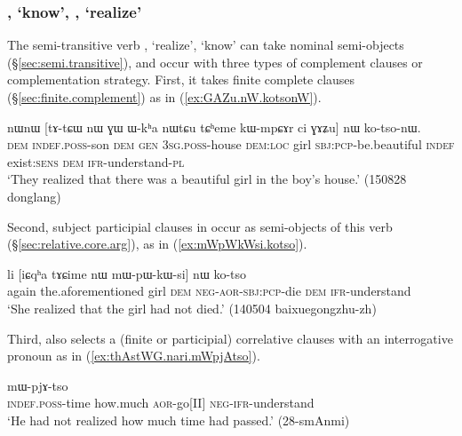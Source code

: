 \subsubsection{, `know', , `realize'} \label{sec:tso.sWXsAl}
The semi-transitive verb , `realize',  `know' can take nominal semi-objects (§\ref{sec:semi.transitive}), and occur with three types of complement clauses or complementation strategy. First, it takes finite complete clauses (§\ref{sec:finite.complement}) as in (\ref{ex:GAZu.nW.kotsonW}).

\begin{exe}
\ex \label{ex:GAZu.nW.kotsonW}
\gll  nɯnɯ [tɤ-tɕɯ nɯ ɣɯ ɯ-kʰa nɯtɕu tɕʰeme kɯ-mpɕɤr ci ɣɤʑu] nɯ ko-tso-nɯ. \\
\textsc{dem} \textsc{indef}.\textsc{poss}-son \textsc{dem} \textsc{gen} \textsc{3sg}.\textsc{poss}-house \textsc{dem}:\textsc{loc} girl \textsc{sbj}:\textsc{pcp}-be.beautiful \textsc{indef} exist:\textsc{sens} \textsc{dem} \textsc{ifr}-understand-\textsc{pl} \\
\glt `They realized that there was a beautiful girl in the boy's house.' (150828 donglang)
\end{exe}

Second, subject participial clauses in  occur as semi-objects of this verb (§\ref{sec:relative.core.arg}), as in (\ref{ex:mWpWkWsi.kotso}).

\begin{exe}
\ex \label{ex:mWpWkWsi.kotso}
\gll  li [iɕqʰa tɤɕime nɯ mɯ-pɯ-kɯ-si] nɯ ko-tso \\
again the.aforementioned girl \textsc{dem} \textsc{neg}-\textsc{aor}-\textsc{sbj}:\textsc{pcp}-die \textsc{dem} \textsc{ifr}-understand \\
\glt  `She realized that the girl had not died.' (140504 baixuegongzhu-zh)
\end{exe}

Third,  also selects a (finite or participial) correlative clauses with an interrogative pronoun as in (\ref{ex:thAstWG.nari.mWpjAtso}).

\begin{exe}
\ex \label{ex:thAstWG.nari.mWpjAtso}
 mɯ-pjɤ-tso \\
\textsc{indef}.\textsc{poss}-time how.much \textsc{aor}-go[II] \textsc{neg}-\textsc{ifr}-understand \\
\glt `He had not realized how much time had passed.' (28-smAnmi)
\end{exe}

